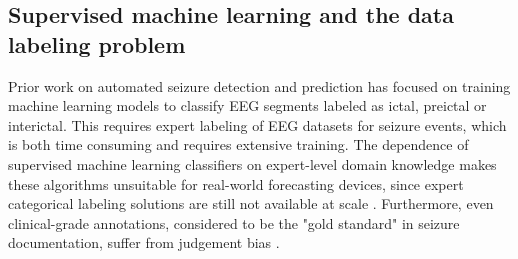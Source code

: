 \subsection{Supervised machine learning and the data labeling problem}
Prior work on automated seizure detection and prediction has focused on training machine learning models to classify EEG segments labeled as ictal, preictal or interictal. This requires expert labeling of EEG datasets for seizure events, which is both time consuming and requires extensive training. The dependence of supervised machine learning classifiers on expert-level domain knowledge makes these algorithms unsuitable for real-world forecasting devices, since expert categorical labeling solutions are still not available at scale \cite{rasheed2020machine}.
Furthermore, even clinical-grade annotations, considered to be the "gold standard" in seizure documentation, suffer from judgement bias \cite{halford2015inter}.

